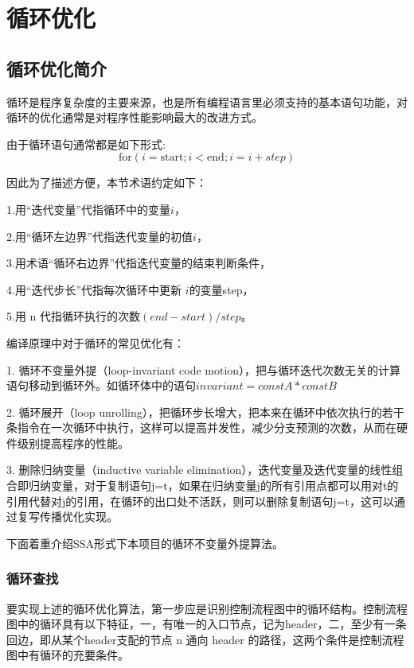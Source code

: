 
\chapter{循环优化}

\section{循环优化简介}

循环是程序复杂度的主要来源，也是所有编程语言里必须支持的基本语句功能，对循环的优化通常是对程序性能影响最大的改进方式。

由于循环语句通常都是如下形式:
$$ \text{for} (i = \text{start}; i<\text{end};i = i+ step) $$

因此为了描述方便，本节术语约定如下：

1.用“迭代变量”代指循环中的变量$i$，

2.用“循环左边界”代指迭代变量的初值$i$，

3.用术语“循环右边界”代指迭代变量的结束判断条件，

4.用“迭代步长”代指每次循环中更新 $i$的变量step，

5.用 n 代指循环执行的次数${(end-start)}/{step} $。

编译原理中对于循环的常见优化有：

1. 循环不变量外提（loop-invariant code motion），把与循环迭代次数无关的计算语句移动到循环外。如循环体中的语句$invariant = constA * constB$

2. 循环展开（loop unrolling），把循环步长增大，把本来在循环中依次执行的若干条指令在一次循环中执行，这样可以提高并发性，减少分支预测的次数，从而在硬件级别提高程序的性能。

3. 删除归纳变量（inductive variable elimination），迭代变量及迭代变量的线性组合即归纳变量，对于复制语句j=t，如果在归纳变量j的所有引用点都可以用对t的引用代替对j的引用，在循环的出口处不活跃，则可以删除复制语句j=t，这可以通过复写传播优化实现。

下面着重介绍SSA形式下本项目的循环不变量外提算法。

\subsection{循环查找}

要实现上述的循环优化算法，第一步应是识别控制流程图中的循环结构。控制流程图中的循环具有以下特征，一，有唯一的入口节点，记为header，二，至少有一条回边，即从某个header支配的节点 n 通向 header 的路径，这两个条件是控制流程图中有循环的充要条件。

